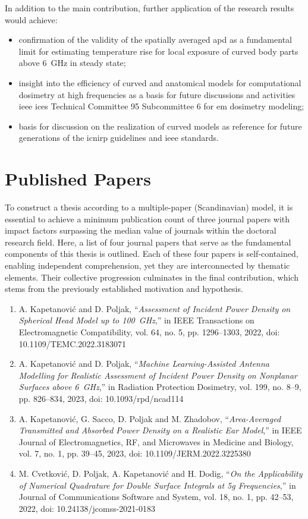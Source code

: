 In addition to the main contribution, further application of the research results would achieve:
\begin{itemize}
    \item confirmation of the validity of the spatially averaged \gls{apd} as a fundamental limit for estimating temperature rise for local exposure of curved body parts above \SI{6}{\GHz} in steady state;
    \item insight into the efficiency of curved and anatomical models for computational dosimetry at high frequencies as a basis for future discussions and activities \gls{ieee} \gls{ices} Technical Committee 95 Subcommittee 6 for \gls{em} dosimetry modeling;
    \item basis for discussion on the realization of curved models as reference for future generations of the \gls{icnirp} guidelines and \gls{ieee} standards.
\end{itemize}

\section{Published Papers}
\label{sec:published_papers}
To construct a thesis according to a multiple-paper (Scandinavian) model, it is essential to achieve a minimum publication count of three journal papers with impact factors surpassing the median value of journals within the doctoral research field.
Here, a list of four journal papers that serve as the fundamental components of this thesis is outlined.
Each of these four papers is self-contained, enabling independent comprehension, yet they are interconnected by thematic elements.
Their collective progression culminates in the final contribution, which stems from the previously established motivation and hypothesis.

\begin{enumerate}
    \item A. Kapetanović and D. Poljak, ``\textit{Assessment of Incident Power Density on Spherical Head Model up to \SI{100}{\GHz}},'' in IEEE Transactions on Electromagnetic Compatibility, vol. 64, no. 5, pp. 1296--1303, 2022, doi: 10.1109/TEMC.2022.3183071
    \item A. Kapetanović and D. Poljak, ``\textit{Machine Learning-Assisted Antenna Modelling for Realistic Assessment of Incident Power Density on Nonplanar Surfaces above \SI{6}{\GHz}},'' in Radiation Protection Dosimetry, vol. 199, no. 8--9, pp. 826--834, 2023, doi: 10.1093/rpd/ncad114
    \item A. Kapetanović, G. Sacco, D. Poljak and M. Zhadobov, ``\textit{Area-Averaged Transmitted and Absorbed Power Density on a Realistic Ear Model},'' in IEEE Journal of Electromagnetics, RF, and Microwaves in Medicine and Biology, vol. 7, no. 1, pp. 39--45, 2023, doi: 10.1109/JERM.2022.3225380
    \item M. Cvetković, D. Poljak, A. Kapetanović and H. Dodig, ``\textit{On the Applicability of Numerical Quadrature for Double Surface Integrals at \gls{5g} Frequencies},'' in Journal of Communications Software and System, vol. 18, no. 1, pp. 42--53, 2022, doi: 10.24138/jcomss-2021-0183
\end{enumerate}

